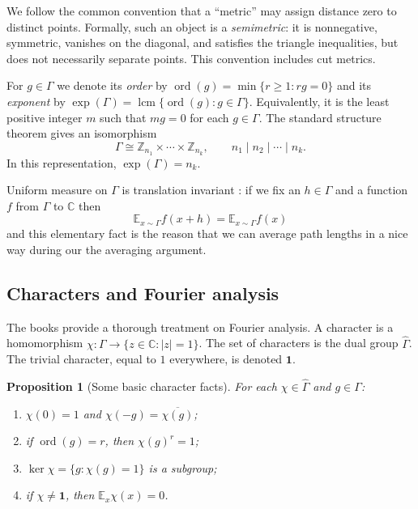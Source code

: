 \documentclass[11pt]{article}
\newtheorem{proposition}[theorem]{Proposition}
\theoremstyle{definition}
\theoremstyle{remark}
\newcommand{\E}{\mathbb{E}}
\newcommand{\C}{\mathbb{C}}
\newcommand{\Z}{\mathbb{Z}}
\newcommand{\Gammahat}{\widehat{\Gamma}}
\newcommand{\ord}{\operatorname{ord}}
\begin{document}
We follow the common convention that a ``metric'' may assign distance zero to distinct points. Formally, such an object is a \emph{semimetric}: it is nonnegative, symmetric, vanishes on the diagonal, and satisfies the triangle inequalities, but does not necessarily separate points. This convention includes cut metrics.




For $g\in\Gamma$ we denote its \emph{order} by $\ord(g)=\min\{r \geq 1:rg=0\}$ and its \emph{exponent}  by $\exp(\Gamma)=\operatorname{lcm}\{\ord(g):g\in\Gamma\}$. Equivalently, it is the least positive integer $m$ such that $mg=0$ for each $g\in\Gamma$. The standard structure theorem \cite{dummitfoote} gives an isomorphism
\begin{equation}\label{eq:invariant-factors}
  \Gamma\cong \Z_{n_1}\times\cdots\times\Z_{n_k},
  \qquad n_1\mid n_2\mid\cdots\mid n_k.
\end{equation}
In this representation, $\exp(\Gamma)=n_k$.

Uniform measure on $\Gamma$ is translation invariant \cite{analysistopologyhowes}: if we fix an $h\in\Gamma$ and a function $f$ from $\Gamma$ to $\C$ then 
\begin{equation}\label{eq:translation-invariance}
  \E_{x\sim\Gamma}f(x+h)=\E_{x\sim\Gamma}f(x)
\end{equation}
and this elementary fact is the reason that we can average path lengths in a nice way during our the averaging argument.

\subsection{Characters and Fourier analysis}
The books \cite{kantor2015mathematics, Terras99} provide a thorough treatment on Fourier analysis.  A character is a homomorphism $\chi:\Gamma\to\{z\in\C:|z|=1\}$. The set of characters is the dual group $\Gammahat$. The trivial character, equal to $1$ everywhere, is denoted $\mathbf{1}$.

\begin{proposition}[Some basic character facts]\label{prop:character-facts}
For each $\chi\in\Gammahat$ and $g\in\Gamma$:
\begin{enumerate}[label=(\roman*)]
  \item $\chi(0)=1$ and $\chi(-g)=\overline{\chi(g)}$;
  \item if $\ord(g)=r$, then $\chi(g)^r=1$;
  \item $\ker\chi=\{g:\chi(g)=1\}$ is a subgroup;
  \item if $\chi\ne\mathbf{1}$, then $\E_x\chi(x)=0$.
\end{enumerate}
\end{proposition}
\end{document}
